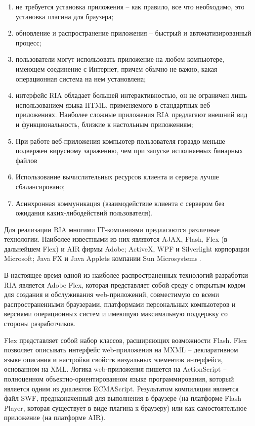 \begin{enumerate}

\item не требуется установка приложения – как правило, все что необходимо, это установка плагина 
для браузера;
\item обновление и распространение приложения  – быстрый и автоматизированный процесс;
\item пользователи могут использовать приложение на любом компьютере, имеющем соединение с Интернет, 
причем обычно не важно, какая операционная система на нем установлена;
\item интерфейс  RIA обладает большей интерактивностью, он не ограничен лишь использованием языка 
HTML, применяемого в стандартных веб-приложениях. Наиболее сложные приложения RIA предлагают 
внешний вид и функциональность, близкие к настольным приложениям;
\item При работе веб-приложения компьютер пользователя гораздо меньше подвержен вирусному заражению, 
чем при запуске исполняемых бинарных файлов
\item Использование вычислительных ресурсов клиента и сервера лучше сбалансировано;
\item Асинхронная коммуникация (взаимодействие клиента с сервером без ожидания каких-либодействий 
пользователя).

\end{enumerate}

Для реализации RIA многими IT-компаниями предлагаются различные технологии. Наиболее известными из 
них являются AJAX,  Flash, Flex (в дальнейшем Flex)  и AIR  фирмы Adobe; ActiveX, WPF  и Silverlight  
корпорации Microsoft; Java FX  и Java Applets  компании Sun Microsystems .

В настоящее время одной из наиболее распространенных технологий разработки RIA является Adobe Flex,  
которая представляет собой  среду с открытым кодом для создания и обслуживания web-приложений, 
совместимую со всеми распространенными браузерами,  платформами персональных компьютеров и версиями 
операционных систем и имеющую максимальную поддержку со стороны разработчиков. 

Flex представляет собой набор классов,  расширяющих возможности Flash. Flex позволяет описывать 
интерфейс web-приложения на MXML – декларативном языке описания и настройки свойств визуальных 
элементов интерфейса, основанном на XML. Логика web-приложения пишется на ActionScript –  полноценном 
объектно-ориентированном языке программирования,  который является одним из диалектов ECMAScript. 
Результатом компиляции является файл SWF,  предназначенный для выполнения в браузере (на платформе 
Flash Player,  которая существует в виде плагина к браузеру)  или как самостоятельное приложение (на 
платформе AIR).
  
